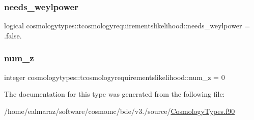 \subsubsection{\texorpdfstring{needs\+\_\+weylpower}{needs\_weylpower}}
{\footnotesize\ttfamily logical cosmologytypes\+::tcosmologyrequirementslikelihood\+::needs\+\_\+weylpower = .false.}

\mbox{\label{structcosmologytypes_1_1tcosmologyrequirementslikelihood_a34ad1a7f2fa1b20a25dfde990a9a76a3}} 
\subsubsection{\texorpdfstring{num\+\_\+z}{num\_z}}
{\footnotesize\ttfamily integer cosmologytypes\+::tcosmologyrequirementslikelihood\+::num\+\_\+z = 0}



The documentation for this type was generated from the following file\+:\begin{DoxyCompactItemize}
\item 
/home/ealmaraz/software/cosmomc/bde/v3./source/\mbox{\hyperlink{CosmologyTypes_8f90}{Cosmology\+Types.\+f90}}\end{DoxyCompactItemize}
